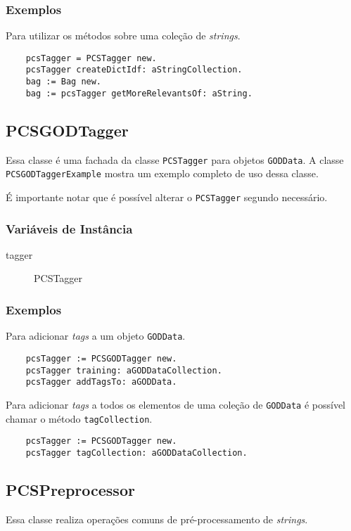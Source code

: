 \subsubsection{Exemplos}
Para utilizar os métodos sobre uma coleção de \textit{strings}.
    \begin{verbatim}
    pcsTagger = PCSTagger new.
    pcsTagger createDictIdf: aStringCollection.
    bag := Bag new.
    bag := pcsTagger getMoreRelevantsOf: aString.
    \end{verbatim}
    
\subsection{PCSGODTagger}
Essa classe é uma fachada da classe \texttt{PCSTagger} para objetos \texttt{GODData}. A classe
\texttt{PCSGODTaggerExample} mostra um exemplo completo de uso dessa classe.

É importante notar que é possível alterar o \texttt{PCSTagger} segundo necessário.

\subsubsection{Variáveis de Instância}
\begin{description}
 \item  [tagger] PCSTagger 
\end{description}

\subsubsection{Exemplos}
    Para adicionar \textit{tags} a um objeto \texttt{GODData}.
    \begin{verbatim}
    pcsTagger := PCSGODTagger new.
    pcsTagger training: aGODDataCollection.
    pcsTagger addTagsTo: aGODData.
    \end{verbatim}
    
    Para adicionar \textit{tags} a todos os elementos de uma coleção de \texttt{GODData} é
    possível chamar o método \texttt{tagCollection}.
    \begin{verbatim}
    pcsTagger := PCSGODTagger new.
    pcsTagger tagCollection: aGODDataCollection.
    \end{verbatim}


\subsection{PCSPreprocessor}
Essa classe realiza operações comuns de pré-processamento de \textit{strings}.


